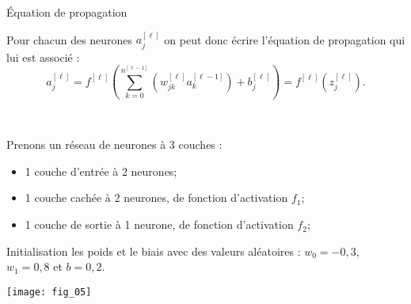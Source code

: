 \begin{defi}{Équation de propagation}

Pour chacun des neurones $a_j^{[\ell]}$ on peut donc écrire l'équation de propagation qui lui est associé : 
$$
a_j^{[\ell]} = f^{[\ell]}\left(\sum\limits_{k=0}^{n^{[\ell-1]}}\left( w^{[\ell]}_{jk} a_k^{[\ell-1]} \right) + b^{[\ell]}_{j}\right) = f^{[\ell]}\left(z_j^{[\ell]}\right).
$$

\end{defi}


\begin{exemple}~\\

\begin{minipage}[c]{.4\linewidth}

Prenons un réseau de neurones à 3 couches : 
\begin{itemize}
\item 1 couche d'entrée à 2 neurones;
\item 1 couche cachée à 2 neurones, de fonction d'activation $f_1$;
\item 1 couche de sortie à 1 neurone, de fonction d'activation $f_2$; 
\end{itemize}

Initialisation les poids et le biais avec des valeurs aléatoires : $w_0 = -0,3$, $w_1 = 0,8$ et $b=0,2$.



\end{minipage}\hfill
\begin{minipage}[c]{.55\linewidth}
\begin{center}
\texttt{[image: fig\_05]}
\end{center}
%
\end{minipage}


\end{exemple}
